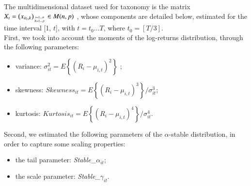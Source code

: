 The multidimensional dataset used for taxonomy is the matrix $X_{t}=\left(x_{i t_{t}, k}\right)_{i=1 \ldots n \atop k=1 \ldots p} \in M(n, p)$ , whose components are detailed below, estimated for the time interval [1, $t$], with $t=t_{0} \ldots T$, where $t_{0}=[T / 3]$.\\
First, we took into account the moments of the log-returns distribution, through the following parameters:

\begin{itemize}
\item variance: $\sigma_{i t}^{2}=E\left\{{(R_{i}-\mu_{i,t})}^2\right\}$ ;
 \item skewness:  $Skewness_{i t}=E\left\{{(R_{i}-\mu_{i,t})}^3\right\}/{\sigma}_{i t}^{3}$;
 \item kurtosis: $Kurtosis_{i t} =E\left\{{(R_{i}-\mu_{i,t})}^4\right\}/{\sigma}_{i t}^{4}$.
\end{itemize}

Second, we estimated the following parameters of the $\alpha$-stable distribution, in order to capture some scaling properties:
\begin{itemize}
	\item the tail parameter: \textit{Stable\_${\alpha}_{i t}$};
	\item the scale parameter: \textit{Stable\_${\gamma}_{i t}$}.
\end{itemize}

